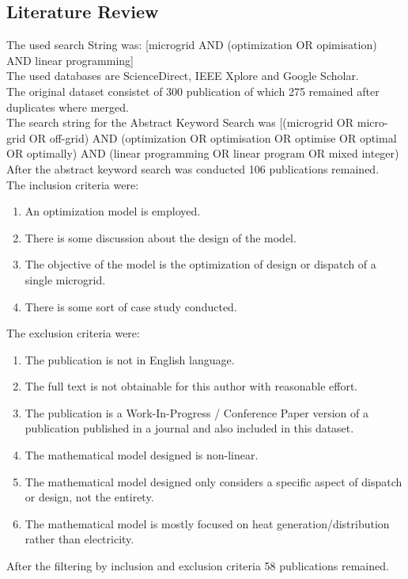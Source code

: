 \documentclass[
	11pt,								%
	DIV10,								%
	a4paper,         					%
	oneside,							%
	headheight=20pt,					%
	footheight=20pt,					%
    parskip=full,						%
    listof=totoc,						%
	bibliography=totoc,					%
	index=totoc,						%
]{scrartcl}
\begin{document}
\subsection{Literature Review}
The used search String was:  [microgrid AND (optimization OR opimisation) AND linear programming]
\\
The used databases are ScienceDirect, IEEE Xplore and Google Scholar.
\\
The original dataset consistet of 300 publication of which 275 remained after duplicates where merged.
\\
The search string for the Abstract Keyword Search was [(microgrid OR micro-grid OR off-grid) AND (optimization OR optimisation OR optimise OR optimal OR optimally) AND (linear programming OR linear program OR mixed integer)
\\
After the abstract keyword search was conducted 106 publications remained.
\\
The inclusion criteria were:
\begin{enumerate}
	\item An optimization model is employed.
	\item There is some discussion about the design of the model.
	\item The objective of the model is the optimization of design or dispatch of a single microgrid.
	\item There is some sort of case study conducted.
\end{enumerate}
The exclusion criteria were:
\begin{enumerate}
	\item The publication is not in English language.
	\item The full text is not obtainable for this author with reasonable effort.
	\item The publication is a Work-In-Progress / Conference Paper version of a publication published in a journal and also included in this dataset.
	\item The mathematical model designed is non-linear.
	\item The mathematical model designed only considers a specific aspect of dispatch or design, not the entirety.
	\item The mathematical model is mostly focused on heat generation/distribution rather than electricity.
\end{enumerate}
After the filtering by inclusion and exclusion criteria 58 publications remained.


\newpage								%
\renewcommand\refname{Literature}			%
\printbibliography
\end{document}
